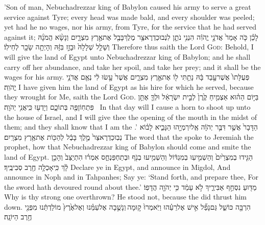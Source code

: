 {’Son of man, Nebuchadrezzar king of Babylon caused his army to serve a great service against Tyre; every head was made bald, and every shoulder was peeled; yet had he no wages, nor his army, from Tyre, for the service that he had served against it;}
{לָכֵ֗ן כֹּ֤ה אָמַר֙ אֲדֹנָ֣י יֱהֹוִ֔ה הִנְנִ֥י נֹתֵ֛ן לִנְבוּכַדְרֶאצַּ֥ר מֶלֶךְ\maqqaf בָּבֶ֖ל אֶת\maqqaf אֶ֣רֶץ מִצְרָ֑יִם וְנָשָׂ֨א הֲמֹנָ֜הּ וְשָׁלַ֤ל שְׁלָלָהּ֙ וּבָזַ֣ז בִּזָּ֔הּ וְהָיְתָ֥ה שָׂכָ֖ר לְחֵילֽוֹ׃}
{Therefore thus saith the Lord \textsc{God}: Behold, I will give the land of Egypt unto Nebuchadrezzar king of Babylon; and he shall carry off her abundance, and take her spoil, and take her prey; and it shall be the wages for his army.}
{פְּעֻלָּתוֹ֙ אֲשֶׁר\maqqaf עָ֣בַד בָּ֔הּ נָתַ֥תִּי ל֖וֹ אֶת\maqqaf אֶ֣רֶץ מִצְרָ֑יִם אֲשֶׁר֙ עָ֣שׂוּ לִ֔י נְאֻ֖ם אֲדֹנָ֥י יֱהֹוִֽה׃}
{I have given him the land of Egypt as his hire for which he served, because they wrought for Me, saith the Lord \textsc{God}.}
{בַּיּ֣וֹם הַה֗וּא אַצְמִ֤יחַ קֶ֙רֶן֙ לְבֵ֣ית יִשְׂרָאֵ֔ל וּלְךָ֛ אֶתֵּ֥ן פִּתְחֽוֹן\maqqaf פֶּ֖ה בְּתוֹכָ֑ם וְיָדְע֖וּ כִּֽי\maqqaf אֲנִ֥י יְהֹוָֽה׃ \petucha }
{In that day will I cause a horn to shoot up unto the house of Israel, and I will give thee the opening of the mouth in the midst of them; and they shall know that I am the \lord.’}
\newperek
{}
\label{haft_15}
\setcounter{chap}{46}
\setcounter{verse}{13}
{הַדָּבָר֙ אֲשֶׁ֣ר דִּבֶּ֣ר יְהֹוָ֔ה אֶֽל\maqqaf יִרְמְיָ֖הוּ הַנָּבִ֑יא לָב֗וֹא נְבֽוּכַדְרֶאצַּר֙ מֶ֣לֶךְ בָּבֶ֔ל לְהַכּ֖וֹת אֶת\maqqaf אֶ֥רֶץ מִצְרָֽיִם׃}
{The word that the \lord\space spoke to Jeremiah the prophet, how that Nebuchadrezzar king of Babylon should come and smite the land of Egypt.}
{הַגִּ֤ידוּ בְמִצְרַ֙יִם֙ וְהַשְׁמִ֣יעֽוּ בְמִגְדּ֔וֹל וְהַשְׁמִ֥יעוּ בְנֹ֖ף וּבְתַחְפַּנְחֵ֑ס אִמְר֗וּ הִתְיַצֵּב֙ וְהָכֵ֣ן לָ֔ךְ כִּֽי\maqqaf אָכְלָ֥ה חֶ֖רֶב סְבִיבֶֽיךָ׃}
{Declare ye in Egypt, and announce in Migdol, And announce in Noph and in Tahpanhes; Say ye: ‘Stand forth, and prepare thee, For the sword hath devoured round about thee.’}
{מַדּ֖וּעַ נִסְחַ֣ף אַבִּירֶ֑יךָ לֹ֣א עָמַ֔ד כִּ֥י יְהֹוָ֖ה הֲדָפֽוֹ׃}
{Why is thy strong one overthrown? He stood not, because the \lord\space did thrust him down.}
{הִרְבָּ֖ה כּוֹשֵׁ֑ל גַּם\maqqaf נָפַ֞ל אִ֣ישׁ אֶל\maqqaf רֵעֵ֗הוּ וַיֹּֽאמְרוּ֙ ק֣וּמָה \legarmeh  וְנָשֻׁ֣בָה אֶל\maqqaf עַמֵּ֗נוּ וְאֶל\maqqaf אֶ֙רֶץ֙ מוֹלַדְתֵּ֔נוּ מִפְּנֵ֖י חֶ֥רֶב הַיּוֹנָֽה׃}
